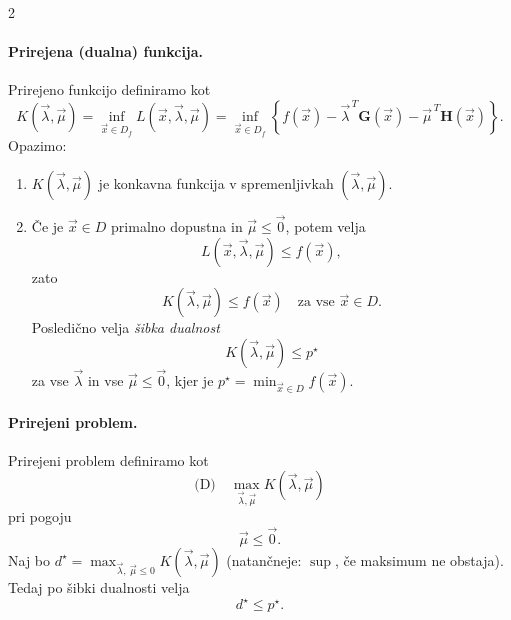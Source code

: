 \documentclass{article}
\begin{document}
\begin{multicols}{2}
	\paragraph{Prirejena (dualna) funkcija.}
	Prirejeno funkcijo definiramo kot
	\[
		K(\vec{\lambda}, \vec{\mu})
		= \inf_{\vec{x} \in D_f} L(\vec{x}, \vec{\lambda}, \vec{\mu})
		= \inf_{\vec{x} \in D_f} \left\{ f(\vec{x}) - \vec{\lambda}^{\,T}\mathbf{G}(\vec{x}) - \vec{\mu}^{\,T}\mathbf{H}(\vec{x}) \right\}.
	\]
	Opazimo:
	\begin{enumerate}
		\item \(K(\vec{\lambda}, \vec{\mu})\) je konkavna funkcija v spremenljivkah \((\vec{\lambda},\vec{\mu})\).
		\item Če je \(\vec{x}\in D\) primalno dopustna in \(\vec{\mu}\le \vec{0}\), potem velja
		      \[
			      L(\vec{x},\vec{\lambda},\vec{\mu}) \le f(\vec{x}),
		      \]
		      zato
		      \[
			      K(\vec{\lambda},\vec{\mu}) \le f(\vec{x}) \quad \text{za vse } \vec{x}\in D.
		      \]
		      Posledično velja \emph{šibka dualnost}
		      \[
			      K(\vec{\lambda},\vec{\mu}) \le p^\star
		      \]
		      za vse \(\vec{\lambda}\) in vse \(\vec{\mu}\le \vec{0}\), kjer je \(p^\star=\min_{\vec{x}\in D} f(\vec{x})\).
	\end{enumerate}

	\paragraph{Prirejeni problem.}
	Prirejeni problem definiramo kot
	\[
		\text{(D)} \quad \max_{\vec{\lambda}, \vec{\mu}} K(\vec{\lambda}, \vec{\mu})
	\]
	pri pogoju
	\[
		\vec{\mu} \le \vec{0}.
	\]
	Naj bo \(d^\star = \max_{\vec{\lambda},\ \vec{\mu}\le 0} K(\vec{\lambda},\vec{\mu})\) (natančneje: \(\sup\), če maksimum ne obstaja). Tedaj po šibki dualnosti velja
	\[
		d^\star \le p^\star.
	\]


\end{multicols}
\end{document}
